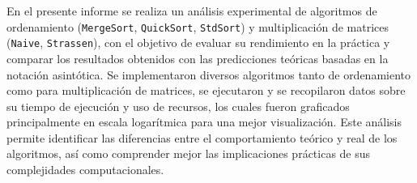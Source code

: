 En el presente informe se realiza un análisis experimental de algoritmos de ordenamiento (\texttt{MergeSort}\cite{Merge}, \texttt{QuickSort}\cite{Quick}, \texttt{StdSort}) 
y multiplicación de matrices (\texttt{Naive}, \texttt{Strassen}\cite{Strassen}), con el objetivo de evaluar su rendimiento en la práctica y comparar los resultados obtenidos con las 
predicciones teóricas basadas en la notación asintótica. Se implementaron diversos algoritmos tanto de ordenamiento como para multiplicación de matrices, se ejecutaron
y se recopilaron datos sobre su tiempo de ejecución y uso de recursos, los cuales fueron graficados principalmente en escala logarítmica para una mejor visualización. 
Este análisis permite identificar las diferencias entre el comportamiento teórico y real de los algoritmos, así como comprender mejor las implicaciones prácticas de sus 
complejidades computacionales.